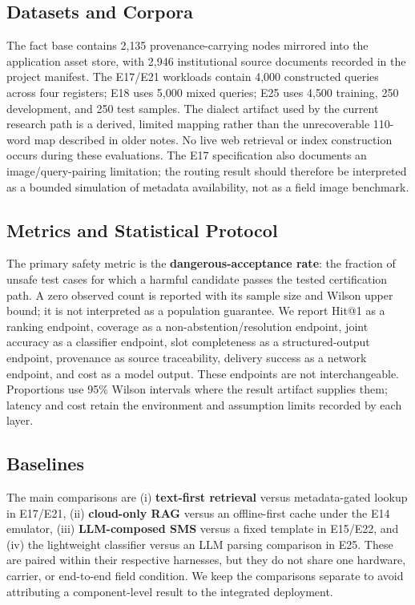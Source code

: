 \documentclass[11pt,a4paper]{article}
\begin{document}
\subsection{Datasets and Corpora}
The fact base contains 2{,}135 provenance-carrying nodes mirrored into the application asset store, with 2{,}946 institutional source documents recorded in the project manifest. The E17/E21 workloads contain 4{,}000 constructed queries across four registers; E18 uses 5{,}000 mixed queries; E25 uses 4{,}500 training, 250 development, and 250 test samples. The dialect artifact used by the current research path is a derived, limited mapping rather than the unrecoverable 110-word map described in older notes. No live web retrieval or index construction occurs during these evaluations. The E17 specification also documents an image/query-pairing limitation; the routing result should therefore be interpreted as a bounded simulation of metadata availability, not as a field image benchmark.

\subsection{Metrics and Statistical Protocol}
The primary safety metric is the \textbf{dangerous-acceptance rate}: the fraction of unsafe test cases for which a harmful candidate passes the tested certification path. A zero observed count is reported with its sample size and Wilson upper bound; it is not interpreted as a population guarantee. We report Hit@1 as a ranking endpoint, coverage as a non-abstention/resolution endpoint, joint accuracy as a classifier endpoint, slot completeness as a structured-output endpoint, provenance as source traceability, delivery success as a network endpoint, and cost as a model output. These endpoints are not interchangeable. Proportions use 95\% Wilson intervals where the result artifact supplies them; latency and cost retain the environment and assumption limits recorded by each layer.

\subsection{Baselines}
The main comparisons are (i) \textbf{text-first retrieval} versus metadata-gated lookup in E17/E21, (ii) \textbf{cloud-only RAG} versus an offline-first cache under the E14 emulator, (iii) \textbf{LLM-composed SMS} versus a fixed template in E15/E22, and (iv) the lightweight classifier versus an LLM parsing comparison in E25. These are paired within their respective harnesses, but they do not share one hardware, carrier, or end-to-end field condition. We keep the comparisons separate to avoid attributing a component-level result to the integrated deployment.
\end{document}
